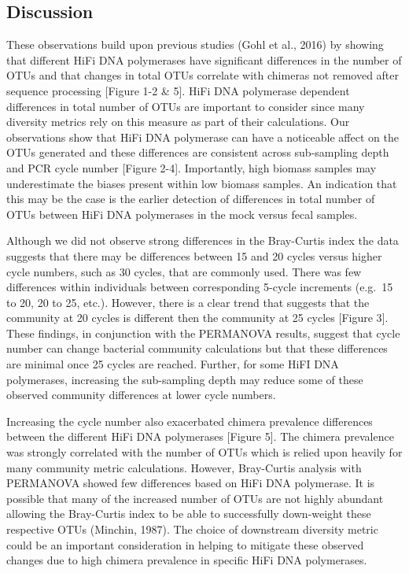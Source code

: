 \documentclass[12pt,]{article}
\begin{document}
\newpage

\subsection{Discussion}\label{discussion}

These observations build upon previous studies (Gohl et al., 2016) by
showing that different HiFi DNA polymerases have significant differences
in the number of OTUs and that changes in total OTUs correlate with
chimeras not removed after sequence processing {[}Figure 1-2 \& 5{]}.
HiFi DNA polymerase dependent differences in total number of OTUs are
important to consider since many diversity metrics rely on this measure
as part of their calculations. Our observations show that HiFi DNA
polymerase can have a noticeable affect on the OTUs generated and these
differences are consistent across sub-sampling depth and PCR cycle
number {[}Figure 2-4{]}. Importantly, high biomass samples may
underestimate the biases present within low biomass samples. An
indication that this may be the case is the earlier detection of
differences in total number of OTUs between HiFi DNA polymerases in the
mock versus fecal samples.

Although we did not observe strong differences in the Bray-Curtis index
the data suggests that there may be differences between 15 and 20 cycles
versus higher cycle numbers, such as 30 cycles, that are commonly used.
There was few differences within individuals between corresponding
5-cycle increments (e.g.~15 to 20, 20 to 25, etc.). However, there is a
clear trend that suggests that the community at 20 cycles is different
then the community at 25 cycles {[}Figure 3{]}. These findings, in
conjunction with the PERMANOVA results, suggest that cycle number can
change bacterial community calculations but that these differences are
minimal once 25 cycles are reached. Further, for some HiFI DNA
polymerases, increasing the sub-sampling depth may reduce some of these
observed community differences at lower cycle numbers.

Increasing the cycle number also exacerbated chimera prevalence
differences between the different HiFi DNA polymerases {[}Figure 5{]}.
The chimera prevalence was strongly correlated with the number of OTUs
which is relied upon heavily for many community metric calculations.
However, Bray-Curtis analysis with PERMANOVA showed few differences
based on HiFi DNA polymerase. It is possible that many of the increased
number of OTUs are not highly abundant allowing the Bray-Curtis index to
be able to successfully down-weight these respective OTUs (Minchin,
1987). The choice of downstream diversity metric could be an important
consideration in helping to mitigate these observed changes due to high
chimera prevalence in specific HiFi DNA polymerases.
\end{document}
